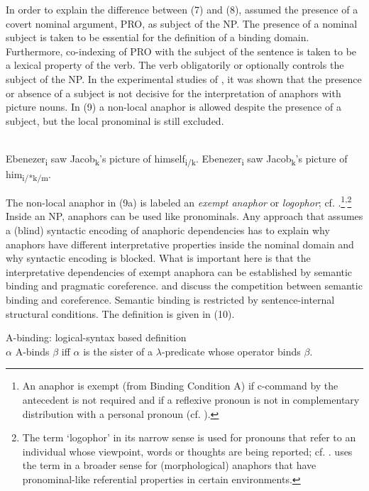 \documentclass[output=paper]{langsci/langscibook}
\begin{document}
In order to explain the difference between (7) and (8), \citet{Chomsky1986Knowledge} assumed the presence of a covert nominal argument, PRO, as subject of the NP. The presence of a nominal subject is taken to be essential for the definition of a binding domain. Furthermore, co-indexing of PRO with the subject of the sentence is taken to be a lexical property of the verb. The verb obligatorily or optionally controls the subject of the NP. In the experimental studies of \citet{Runner2005}, it was shown that the presence or absence of a subject is not decisive for the interpretation of anaphors with picture nouns. In (9) a non-local anaphor is allowed despite the presence of a subject, but the local pronominal is still excluded.

\ea%
    \citet[597]{Runner2005}\label{ex:wein:9}\\
    \ea Ebenezer\textsubscript{i} saw Jacob\textsubscript{k}'s picture of himself\textsubscript{i/k}.
    \ex Ebenezer\textsubscript{i} saw Jacob\textsubscript{k}'s picture of him\textsubscript{i/*k/m}.
    \z
\z    

The non-local anaphor in (9a) is labeled an \textit{exempt anaphor} or \textit{logophor}; cf. \citet{Reuland2011}.\footnote{An anaphor is exempt (from Binding Condition A) if c-command by the antecedent is not required and if a reflexive pronoun is not in complementary distribution with a personal pronoun (cf. \citealt{Büring2005}).}\textsuperscript{,}\footnote{The term ‘logophor’ in its narrow sense is used for pronouns that refer to an individual whose viewpoint, words or thoughts are being reported; cf. \citet{Speas2004}. \citet{Reuland2011} uses the term in a broader sense for (morphological) anaphors that have pronominal-like referential properties in certain environments.}  Inside an NP, anaphors can be used like pronominals. Any approach that assumes a (blind) syntactic encoding of anaphoric dependencies has to explain why anaphors have different interpretative properties inside the nominal domain and why syntactic encoding is blocked. What is important here is that the interpretative dependencies of exempt anaphora can be established by semantic binding and pragmatic coreference. \citet{Reinhart2006} and \citet{Reuland2011} discuss the competition between semantic binding and coreference. Semantic binding is restricted by sentence-internal structural conditions. The definition is given in (10). 

\ea%
    \label{ex:wein:10}
    A-binding: logical-syntax based definition \citep[171]{Reinhart2006}\\
    $\alpha $ A-binds $\beta $ iff $\alpha $ is the sister of a $\lambda $-predicate whose operator binds $\beta $.
\z
\end{document}
